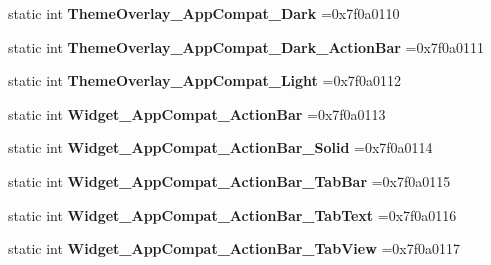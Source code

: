 \begin{DoxyCompactItemize}
static int {\bfseries Theme\+Overlay\+\_\+\+App\+Compat\+\_\+\+Dark} =0x7f0a0110
\item 
\mbox{\label{classandroid_1_1support_1_1v7_1_1recyclerview_1_1R_1_1style_af87a9cc3cd22013853b9d95c055e098b}} 
static int {\bfseries Theme\+Overlay\+\_\+\+App\+Compat\+\_\+\+Dark\+\_\+\+Action\+Bar} =0x7f0a0111
\item 
\mbox{\label{classandroid_1_1support_1_1v7_1_1recyclerview_1_1R_1_1style_ab446fd182ca44fbea89fe6915bc4e7f9}} 
static int {\bfseries Theme\+Overlay\+\_\+\+App\+Compat\+\_\+\+Light} =0x7f0a0112
\item 
\mbox{\label{classandroid_1_1support_1_1v7_1_1recyclerview_1_1R_1_1style_a0540b29eda555177000754fb5db249f4}} 
static int {\bfseries Widget\+\_\+\+App\+Compat\+\_\+\+Action\+Bar} =0x7f0a0113
\item 
\mbox{\label{classandroid_1_1support_1_1v7_1_1recyclerview_1_1R_1_1style_a8558cc2927042ced2537748a6528e191}} 
static int {\bfseries Widget\+\_\+\+App\+Compat\+\_\+\+Action\+Bar\+\_\+\+Solid} =0x7f0a0114
\item 
\mbox{\label{classandroid_1_1support_1_1v7_1_1recyclerview_1_1R_1_1style_ae815b468335e767a4e280565932dd841}} 
static int {\bfseries Widget\+\_\+\+App\+Compat\+\_\+\+Action\+Bar\+\_\+\+Tab\+Bar} =0x7f0a0115
\item 
\mbox{\label{classandroid_1_1support_1_1v7_1_1recyclerview_1_1R_1_1style_a1d714ed57a99f771b4ff0da6e6494a4b}} 
static int {\bfseries Widget\+\_\+\+App\+Compat\+\_\+\+Action\+Bar\+\_\+\+Tab\+Text} =0x7f0a0116
\item 
\mbox{\label{classandroid_1_1support_1_1v7_1_1recyclerview_1_1R_1_1style_a6f9bec76b08b3d0fe99b9a4e09f4b78d}} 
static int {\bfseries Widget\+\_\+\+App\+Compat\+\_\+\+Action\+Bar\+\_\+\+Tab\+View} =0x7f0a0117
\item 

\end{DoxyCompactItemize}
